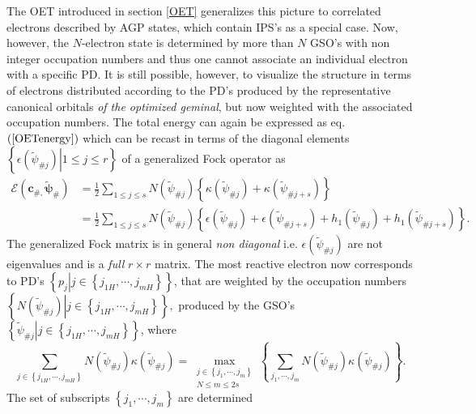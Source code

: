 \documentclass[aps,preprint]{revtex4}%
\begin{document}
The OET introduced in section \ref{OET} generalizes this picture to correlated
electrons described by AGP states, which contain IPS's as a special case. Now,
however, the $N$-electron state is determined by more than $N$ GSO's with non
integer occupation numbers and thus one cannot associate an individual
electron with a specific PD. It is still possible, however, to visualize the
structure in terms of electrons distributed according to the PD's produced by
the representative canonical orbitals \emph{of the optimized geminal}, but now
weighted with the associated occupation numbers. The total energy can again be
expressed as eq. $\left(  \ref{OETenergy}\right)  $ which can be recast in
terms of the diagonal elements $\left\{  \left.  \epsilon\left(  \tilde{\psi
}_{\#j}\right)  \right\vert 1\leq j\leq r\right\}  $ of a generalized Fock
operator\emph{ }\cite{OrtizWeiner2006} as
\begin{align}
\mathcal{E}\left(  \boldsymbol{c}_{\#,}\boldsymbol{\tilde{\psi}}_{\#}\right)
&  =\frac{1}{2}\sum_{1\leq j\leq s}N\left(  \tilde{\psi}_{\#j}\right)
\left\{  \kappa\left(  \tilde{\psi}_{\#j}\right)  +\kappa\left(  \tilde{\psi
}_{\#j+s}\right)  \right\} \nonumber\\
&  =\frac{1}{2}\sum_{1\leq j\leq s}N\left(  \tilde{\psi}_{\#j}\right)
\left\{  \epsilon\left(  \tilde{\psi}_{\#j}\right)  +\epsilon\left(
\tilde{\psi}_{\#j+s}\right)  +h_{1}\left(  \tilde{\psi}_{\#j}\right)
+h_{1}\left(  \tilde{\psi}_{\#j+s}\right)  \right\}  . \label{GenFocken}%
\end{align}
The generalized Fock matrix is in general \emph{non diagonal} i.e.
$\epsilon\left(  \tilde{\psi}_{\#j}\right)  $ are not eigenvalues and is a
\emph{full} $r\times r$ matrix. The most reactive electron now corresponds to
PD's $\left\{  \left.  p_{j}\right\vert j\in\left\{  j_{1H},\cdots
,j_{mH}\right\}  \right\}  $, that are weighted by the occupation numbers
$\left\{  \left.  N\left(  \tilde{\psi}_{\#j}\right)  \right\vert j\in\left\{
j_{1H},\cdots,j_{mH}\right\}  \right\}  ,$ produced by the GSO's $\left\{
\left.  \tilde{\psi}_{\#j}\right\vert j\in\left\{  j_{1H},\cdots
,j_{mH}\right\}  \right\}  $, where
\[
\sum_{j\in\left\{  j_{1H},\cdots,j_{mH}\right\}  }N\left(  \tilde{\psi}%
_{\#j}\right)  \kappa\left(  \tilde{\psi}_{\#j}\right)  =\max_{\substack{j\in
\left\{  j_{1},\cdots,j_{m}\right\}  \\N\leq m\leq2s}}\left\{  \sum
_{j_{1},\cdots,j_{m}}N\left(  \tilde{\psi}_{\#j}\right)  \kappa\left(
\tilde{\psi}_{\#j}\right)  \right\}  .
\]
The set of subscripts $\left\{  j_{1},\cdots,j_{m}\right\}  $ are determined
\end{document}
